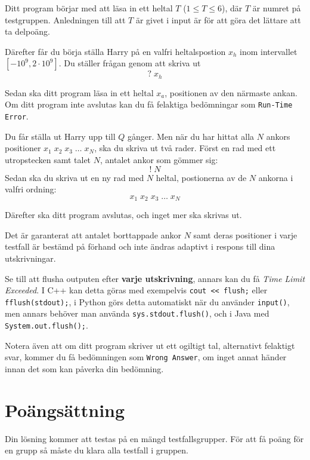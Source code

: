 Ditt program börjar med att läsa in ett heltal $T$ ($1 \leq T \leq 6$), där $T$ är numret på testgruppen. 
Anledningen till att $T$ är givet i input är för att göra det lättare att ta delpoäng.

Därefter får du börja ställa Harry på en valfri heltalspostion $x_h$ inom intervallet $[-10^9,2\cdot10^9]$.
Du ställer frågan genom att skriva ut 
$$? \; x_h$$


Sedan ska ditt program läsa in ett heltal $x_a$, positionen av den närmaste ankan. 
Om ditt program inte avslutas kan du få felaktiga bedömningar som \texttt{Run-Time Error}.

Du får ställa ut Harry upp till $Q$ gånger. Men när du har hittat alla $N$ ankors positioner
$x_1 \; x_2 \; x_3 \; \dots \; x_N$, ska du skriva ut två rader. Först en rad med ett utropstecken
samt talet $N$, antalet ankor som gömmer sig:
$$! \; N$$
Sedan ska du skriva ut en ny rad med $N$ heltal, postionerna av de $N$ ankorna i valfri ordning:
$$x_1 \; x_2 \; x_3 \; \dots \; x_N$$

Därefter ska ditt program avslutas, och inget mer ska skrivas ut.    

Det är garanterat att antalet borttappade ankor $N$ samt deras positioner i varje testfall är bestämd
på förhand och inte ändras adaptivt i respons till dina utskrivningar.

Se till att flusha outputen efter \textbf{varje utskrivning}, annars kan du få \textit{Time Limit Exceeded}.
I C++ kan detta göras med exempelvis \texttt{cout << flush;}
eller \texttt{fflush(stdout);},
i Python görs detta automatiskt när du använder \texttt{input()}, men annars behöver man använda
\texttt{sys.stdout.flush()}, och i Java med \texttt{System.out.flush();}.

Notera även att om ditt program skriver ut ett ogiltigt tal, alternativt felaktigt svar, kommer du få bedömningen
som \texttt{Wrong Answer}, om inget annat händer innan det som kan påverka din bedömning. %

\section*{Poängsättning}
Din lösning kommer att testas på en mängd testfallsgrupper.
För att få poäng för en grupp så måste du klara alla testfall i gruppen.

